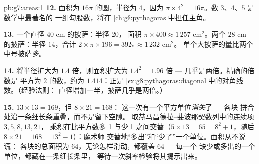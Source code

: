 \begin{solution}{pb:g7:areas:1}
\textbf{12.} 面积为 $16\pi$ 的圆，半径为 $4$，因为
$\pi \times 4^2 = 16\pi$。数 $3$、$4$、$5$ 是数学中最著名的
一组勾股数，将在
\cref{ch:g8:pythagoras}中担任主角。

\textbf{13.} 一个直径 $40$ cm 的披萨：半径 $20$，
面积 $\pi \times 400 \approx 1\,257$ cm$^2$。两个 $28$ cm
的披萨：半径 $14$，合计
$2 \times \pi \times 196 = 392\pi \approx 1\,232$ cm$^2$。
单个大披萨的量比两个中号披萨\emph{多}。

\textbf{14.} 将半径扩大为 $1.4$ 倍，则面积扩大为
$1.4^2 = 1.96$ 倍 --- 几乎是两倍。精确的倍数是
平方为 $2$ 的数，约为 $1.414$：正是
\cref{ex:g8:pythagoras:diagonal}中的对角线数。（经验法则：
直径增加一半，披萨几乎是两倍。）

\textbf{15.} $13 \times 13 = 169$，但 $8 \times 21 = 168$：
这一次有一个平方单位\emph{消失}了 --- 各块
拼合处沿一条细长条重叠，而不是留下空隙。
取赫马昌德拉–斐波那契数列中的连续项 $3, 5, 8, 13, 21$，
乘积在比平方数多 1
与少 1 之间交替（$5 \times 13 = 65 =
8^2 + 1$，随后 $8 \times 21 = 168 = 13^2 - 1$）：魔术师
交替地“多出”和“少了”一个单位。面积从不说谎：
各块的总面积为 $64$，无论怎样滑动，都覆盖 $64$ --- 每一个
缺少或多出的一个单位，都藏在一条细长条里，
等待一次斜率检验将其揭示出来。
\end{solution}
